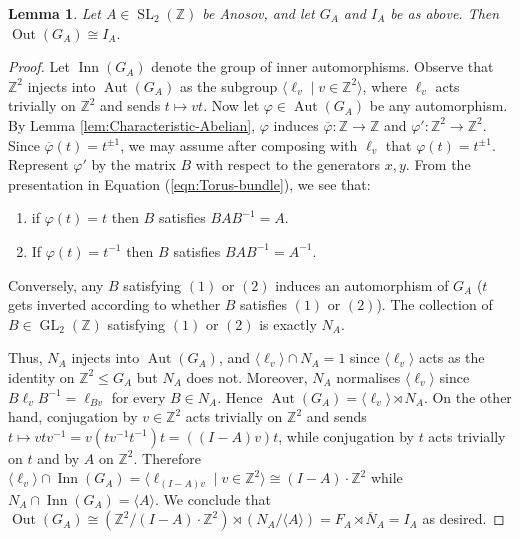 \documentclass{amsart}
\theoremstyle{plain}
\newtheorem{lem}[thm]{Lemma}
\theoremstyle{definition}
\DeclareMathOperator\Aut{Aut}
\DeclareMathOperator\SL{SL}
\DeclareMathOperator\GL{GL}
\DeclareMathOperator{\Out}{Out}
\DeclareMathOperator{\Inn}{Inn}
\newcommand{\Z}{\mathbb{Z}}
\begin{document}
\begin{lem}\label{lem:Sol-Outer-Automorphism}
    Let $A\in \SL_2(\Z)$ be Anosov, and let $G_A$ and $I_A$ be as above. Then $\Out(G_A)\cong I_A.$
\end{lem}
\begin{proof} 
    Let $\Inn(G_A)$ denote the group of inner automorphisms.
    Observe that $\Z^2$ injects into $\Aut(G_A)$ as the subgroup $\langle \ell_v \mid v\in \Z^2\rangle$, where $\ell_v$ acts trivially on $\Z^2$ and sends $t\mapsto vt$. Now let $\varphi\in \Aut(G_A)$ be any automorphism. By Lemma \ref{lem:Characteristic-Abelian}, $\varphi$ induces $\overline{\varphi}\colon\Z\rightarrow \Z$ and $\varphi'\colon \Z^2\rightarrow \Z^2$. Since $\overline{\varphi}(t)=t^{\pm1}$, we may assume after composing with $\ell_v$ that $\varphi(t)=t^{\pm1}$. Represent $\varphi'$ by the matrix $B$ with respect to the generators $x,y$. From the presentation in Equation (\ref{eqn:Torus-bundle}), we see that:
    \begin{enumerate}
        \item if $\varphi(t)=t$ then $B$ satisfies $BAB^{-1}=A$.
        \item If $\varphi(t)=t^{-1}$ then $B$ satisfies $BAB^{-1}=A^{-1}$.
    \end{enumerate} Conversely, any $B$ satisfying $(1)$ or $(2)$ induces an automorphism of $G_A$ ($t$ gets inverted according to whether $B$ satisfies $(1)$ or $(2)$). The collection of $B\in \GL_2(\Z)$ satisfying $(1)$ or $(2)$ is exactly $N_A$. 

    Thus, $N_A$ injects into $\Aut(G_A)$, and $\langle \ell_v\rangle\cap N_A=1$ since $\langle \ell_v\rangle$ acts as the identity on $\Z^2\leq G_A$ but $N_A$ does not.  Moreover, $N_A$ normalises $\langle \ell_v\rangle$ since $B\ell_vB^{-1}=\ell_{Bv}$ for every $B\in N_A$. Hence $\Aut(G_A)= \langle \ell_v\rangle\rtimes N_A$. On the other hand, conjugation by $v\in \Z^2$ acts trivially on $\Z^2$ and sends $t\mapsto vtv^{-1}=v(tv^{-1}t^{-1})t=((I-A)v) t$, while conjugation by $t$ acts trivially on $t$ and by $A$ on $\Z^2.$ Therefore
    $\langle \ell_v\rangle\cap \Inn(G_A)= \langle\ell_{(I-A)v}\mid v\in \Z^2\rangle\cong (I-A)\cdot\Z^2$ while $N_A\cap \Inn(G_A)=\langle A\rangle$.  We conclude that $\Out(G_A)\cong (\Z^2/(I-A)\cdot \Z^2)\rtimes (N_A/\langle A\rangle)=F_A\rtimes \overline{N}_A=I_A$ as desired. 
\end{proof}
\end{document}
